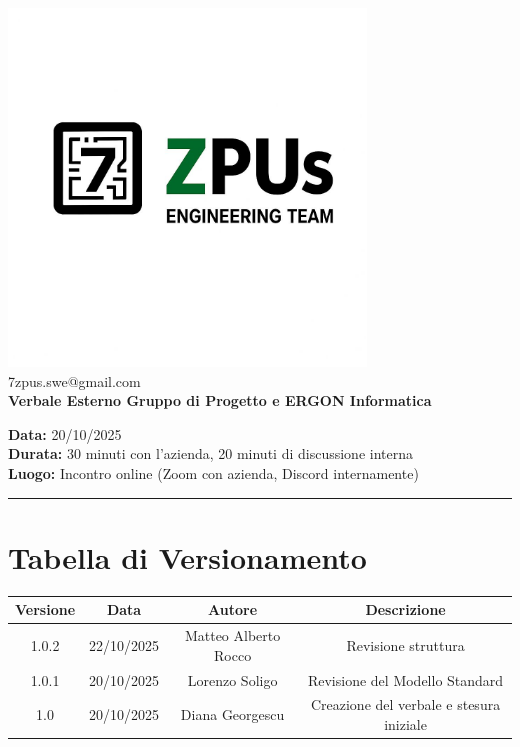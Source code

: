 \documentclass[a4paper,12pt]{article}
\begin{document}
\begin{center}
    \includegraphics[width=9.5cm]{../../../assets/logo7zpus.jpeg}\\
    \small\hspace{10cm} 7zpus.swe@gmail.com\\
    \Large \textbf{Verbale Esterno Gruppo di Progetto e ERGON Informatica}\\
    \vspace{0.5cm}
\end{center}


\noindent
\textbf{Data:} 20/10/2025 \\
\textbf{Durata:}  30 minuti con l'azienda, 20 minuti di discussione interna \\
\textbf{Luogo:} Incontro online (Zoom con azienda, Discord internamente)

\vspace{0.3cm}
\hrule
\vspace{0.5cm}

\tableofcontents

\newpage

\section{Tabella di Versionamento}
\begin{center}
\begin{tabular}{|c|c|c|c|}
    \hline
    \textbf{Versione} & \textbf{Data} & \textbf{Autore} & \textbf{Descrizione} \\
    \hline
    1.0.2 & 22/10/2025 & Matteo Alberto Rocco & Revisione struttura \\
    \hline
    1.0.1 & 20/10/2025 & Lorenzo Soligo & Revisione del Modello Standard \\
    \hline
    1.0 & 20/10/2025 & Diana Georgescu & Creazione del verbale e stesura iniziale \\
    \hline
\end{tabular}
\end{center}
\end{document}
